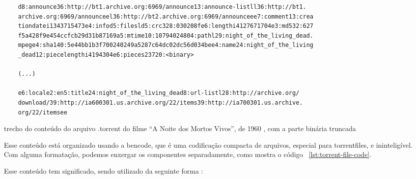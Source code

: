 \begin{listing}[H]
    \begin{verbatim}
    d8:announce36:http://bt1.archive.org:6969/announce13:announce-listll36:http://bt1.
    archive.org:6969/announceel36:http://bt2.archive.org:6969/announceee7:comment13:crea
    tiondatei1343715473e4:infod5:filesld5:crc328:030208fe6:lengthi4127671704e3:md532:627
    f5a428f9e454ccfcb29d31b87169a5:mtime10:10794024804:pathl29:night_of_the_living_dead.
    mpege4:sha140:5e44bb1b3f700240249a5287c64dc02dc56d034bee4:name24:night_of_the_living
    _dead12:piecelengthi4194304e6:pieces23720:<binary>

    (...)

    e6:locale2:en5:title24:night_of_the_living_dead8:url-listl28:http://archive.org/
    download/39:http://ia600301.us.archive.org/22/items39:http://ia700301.us.archive.
    org/22/itemsee
    \end{verbatim}

    \caption{trecho do conteúdo do arquivo .torrent do filme \enquote{A Noite dos Mortos
    Vivos}, de 1960 \cite{torrent-file}, com a parte binária truncada}
    \label{lst:torrent-file-raw}
\end{listing}

Esse conteúdo está organizado usando a \gls{bencode}, que é uma codificação compacta de
arquivos, especial para \glspl*{torrentfile}, e ininteligível. Com alguma formatação,
podemos enxergar os componentes separadamente, como mostra o código
~\ref{lst:torrent-file-code}.

Esse conteúdo tem significado, sendo utilizado da seguinte forma
\cite{wikitheory:bencoding}:

